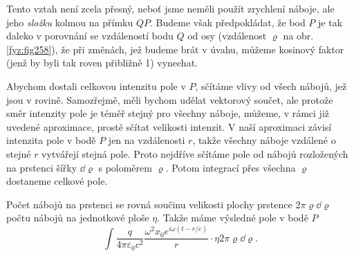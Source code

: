 {    Tento vztah není zcela přesný, neboť jsme neměli použít zrychlení náboje, ale jeho 
    \emph{složku} kolmou na přímku \(QP\). Budeme však předpokládat, že bod \(P\) je tak daleko v 
    porovnání se vzdáleností bodu \(Q\) od osy (vzdálenost \(\varrho\) na obr. \ref{fyz:fig258}), 
    že při změnách, jež budeme brát v úvahu, můžeme kosinový faktor (jenž by byli tak roven 
    přibližně \num{1}) vynechat.
    
    Abychom dostali celkovou intenzitu pole v \(P\), sčítáme vlivy od všech nábojů, jež jsou v 
    rovině. Samozřejmě, měli bychom udělat vektorový součet, ale protože směr intenzity pole je 
    téměř stejný pro všechny náboje, můžeme, v rámci již uvedené aproximace, prostě sčítat 
    velikosti intenzit. V naší aproximaci závisí intenzita pole v bodě \(P\) jen na vzdálenosti 
    \(r\), takže všechny náboje vzdálené o stejné \(r\) vytvářejí stejná pole. Proto nejdříve 
    sčítáme pole od nábojů rozložených na prstenci šířky \(\dd{\varrho}\) s poloměrem \(\varrho\). 
    Potom integrací přes všechna \(\varrho\) dostaneme celkové pole.
    
    Počet nábojů na prstenci se rovná součinu velikosti plochy prstence \(2\pi\varrho\dd{\varrho}\) 
    počtu nábojů na jednotkové ploše \(\eta\). Takže máme výsledné pole v bodě \(P\)
    \begin{equation}\label{fyz:eq333}
      \int\frac{q}{4\pi\varepsilon_0c^2}
      \frac{\omega^2x_0e^{i\omega(t-r/c)}}{r}
      \cdot\eta2\pi\varrho\dd{\varrho}.
    \end{equation}
    
}
